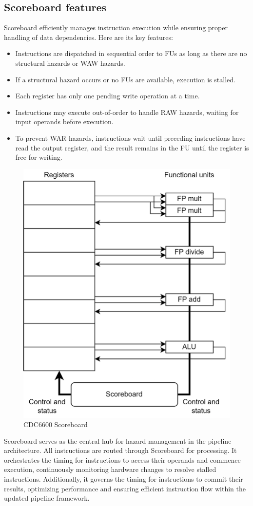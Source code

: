 \subsection{Scoreboard features}
Scoreboard efficiently manages instruction execution while ensuring proper handling of data dependencies.
Here are its key features:
\begin{itemize}
    \item Instructions are dispatched in sequential order to FUs as long as there are no structural hazards or WAW hazards.
    \item If a structural hazard occurs or no FUs are available, execution is stalled.
    \item Each register has only one pending write operation at a time.
    \item Instructions may execute out-of-order to handle RAW hazards, waiting for input operands before execution.
    \item To prevent WAR hazards, instructions wait until preceding instructions have read the output register, and the result remains in the FU until the register is free for writing.
\end{itemize}
\begin{figure}[H]
    \centering
    \includegraphics[width=0.5\linewidth]{images/cdc6600.png}
    \caption{CDC6600 Scoreboard}
\end{figure}
Scoreboard serves as the central hub for hazard management in the pipeline architecture. 
All instructions are routed through Scoreboard for processing.
It orchestrates the timing for instructions to access their operands and commence execution, continuously monitoring hardware changes to resolve stalled instructions. 
Additionally, it governs the timing for instructions to commit their results, optimizing performance and ensuring efficient instruction flow within the updated pipeline framework.

